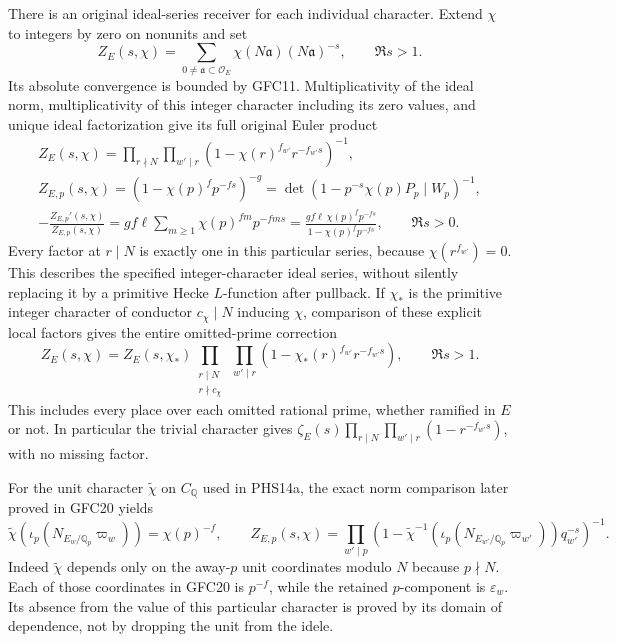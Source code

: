 There is an original ideal-series receiver for each individual
character. Extend $\chi$ to integers by zero on nonunits and set
\begin{equation}\tag{GFC11c}
 Z_E(s,\chi)=\sum_{0\ne\mathfrak a\subset\mathcal O_E}
           \chi(N\mathfrak a)(N\mathfrak a)^{-s},\qquad \Re s>1.
\end{equation}
Its absolute convergence is bounded by GFC11. Multiplicativity of
the ideal norm, multiplicativity of this integer character including
its zero values, and unique ideal factorization give its full
original Euler product
\begin{equation}\tag{GFC11d}
 \begin{gathered}
 Z_E(s,\chi)=
   \prod_{r\nmid N}\prod_{w'\mid r}
      (1-\chi(r)^{f_{w'}}r^{-f_{w'}s})^{-1},\\
 Z_{E,p}(s,\chi)=
      (1-\chi(p)^fp^{-fs})^{-g}
      =\det(1-p^{-s}\chi(p)P_p\mid W_p)^{-1},\\
 -\frac{Z_{E,p}'(s,\chi)}{Z_{E,p}(s,\chi)}
   =gf\ell\sum_{m\ge1}\chi(p)^{fm}p^{-fms}
   =\frac{gf\ell\,\chi(p)^fp^{-fs}}{1-\chi(p)^fp^{-fs}},
       \qquad \Re s>0.
 \end{gathered}
\end{equation}
Every factor at $r\mid N$ is exactly one in this particular
series, because $\chi(r^{f_{w'}})=0$. This describes the specified
integer-character ideal series, without silently replacing it by
a primitive Hecke $L$-function after pullback. If $\chi_*$ is the
primitive integer character of conductor $c_\chi\mid N$ inducing
$\chi$, comparison of these explicit local factors gives the entire
omitted-prime correction
\begin{equation}\tag{GFC11e}
 Z_E(s,\chi)=Z_E(s,\chi_*)
   \prod_{\substack{r\mid N\\r\nmid c_\chi}}\ 
        \prod_{w'\mid r}
                (1-\chi_*(r)^{f_{w'}}r^{-f_{w'}s}),
                  \qquad \Re s>1.
\end{equation}
This includes every place over each omitted rational prime,
whether ramified in $E$ or not. In particular the trivial
character gives $\zeta_E(s)\prod_{r\mid N}\prod_{w'\mid r}
(1-r^{-f_{w'}s})$, with no missing factor.

For the unit character $\widetilde\chi$ on $C_{\mathbb Q}$ used
in PHS14a, the exact norm comparison later proved in GFC20 yields
\begin{equation}\tag{GFC11f}
 \widetilde\chi\!\left(\iota_p(N_{E_w/\mathbb Q_p}\varpi_w)\right)
    =\chi(p)^{-f},\qquad
 Z_{E,p}(s,\chi)=
   \prod_{w'\mid p}
     \left(1-\widetilde\chi^{-1}
          \!\left(\iota_p(N_{E_{w'}/\mathbb Q_p}\varpi_{w'})\right)
                  q_{w'}^{-s}\right)^{-1}.
\end{equation}
Indeed $\widetilde\chi$ depends only on the away-$p$ unit
coordinates modulo $N$ because $p\nmid N$. Each of those
coordinates in GFC20 is $p^{-f}$, while the retained
$p$-component is $\varepsilon_w$. Its absence from the value
of this particular character is proved by its domain of
dependence, not by dropping the unit from the idele.

